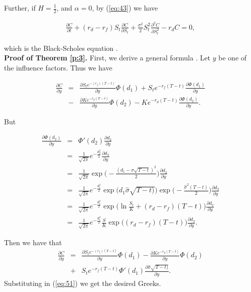 \documentclass[a4paper,11pt]{amsart}
\numberwithin{equation}{section}
\theoremstyle{definition}
\theoremstyle{plain}
\theoremstyle{definition}
\newcommand{\1}{\mathbf{1}}
\begin{document}
Further, if $H=\frac{1}{2}$, and $\alpha=0$, by (\ref{eq:43}) we have

\begin{eqnarray}
\frac{\partial C}{\partial t}+(r_d-r_f)S_t\frac{\partial C}{\partial S_t}+\frac{\sigma^2}{2}S_t^2\frac{\partial^2 C}{\partial S_t^2}
-r_dC=0,
\label{eq:48}
\end{eqnarray}

which is the Black-Scholes equation \cite{black}.\\

\textbf{Proof of Theorem \ref{p:3}.} First, we derive a general formula
. Let $y$ be one of the influence factors. Thus we have

\begin{eqnarray}
\frac{\partial C}{\partial y}&=&\frac{\partial
S_te^{-(r_f)(T-t)}}{\partial
y}\Phi(d_1)+S_te^{-r_f(T-t)}\frac{\partial
\Phi(d_1)}{\partial y}\nonumber\\
&-&\frac{\partial Ke^{-r_d(T-t)}}{\partial
y}\Phi(d_2)-Ke^{-r_d(T-t)}\frac{\partial \Phi(d_2)}{\partial y}.
\label{eq:49}
\end{eqnarray}

But

\begin{eqnarray}
\frac{\partial \Phi(d_2)}{\partial y}&=&\Phi'(d_2)\frac{\partial
d_2}{\partial y}\nonumber\\
&=&\frac{1}{\sqrt{2\pi}}e^{-\frac{d_2^2}{2}}\frac{\partial
d_2}{\partial y}\nonumber\\
&=&\frac{1}{\sqrt{2\pi}}\exp\Big(-\frac{(d_1-\widehat{\sigma}\sqrt{T-t})^2}{2}\Big)\frac{\partial
d_2}{\partial y}\nonumber\\
&=&\frac{1}{\sqrt{2\pi}}e^{-\frac{d_1^2}{2}}\exp\Big(d_1\widehat{\sigma}\sqrt{T-t)}\Big)\exp\Big(-\frac{\widehat{\sigma}^2(T-t)}{2}\Big)\frac{\partial
d_2}{\partial y}\nonumber\\
&=&\frac{1}{\sqrt{2\pi}}e^{-\frac{d_1^2}{2}}\exp\Big(\ln
\frac{S_t}{K}+(r_d-r_f)(T-t)\Big)\frac{\partial
d_2}{\partial y}\nonumber\\
&=&\frac{1}{\sqrt{2\pi}}e^{-\frac{d_1^2}{2}}\frac{S}{K}
\exp\Big((r_d-r_f)(T-t)\Big)\frac{\partial
d_2}{\partial y}.
\label{eq:50}
\end{eqnarray}

Then we have that
\begin{eqnarray}
\frac{\partial C}{\partial y}&=&\frac{\partial S_te^{-(r_f)(T-t)}}{\partial
y}\Phi(d_1)-\frac{\partial Ke^{-r_d(T-t)}}{\partial
y}\Phi(d_2)\nonumber\\
&+&S_te^{-r_f(T-t)}\Phi'(d_1)\frac{\partial\widehat{\sigma}\sqrt{T-t)}}{\partial y}.
\label{eq:51}
\end{eqnarray}
Substituting in (\ref{eq:51}) we get the desired Greeks.\\
\end{document}
